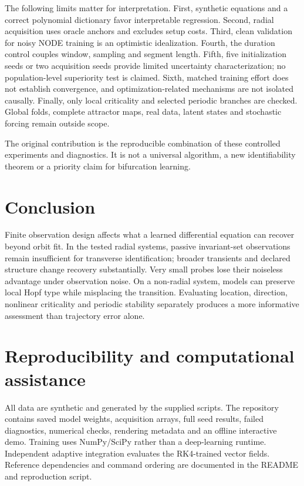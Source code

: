 \documentclass[11pt,a4paper]{article}
\begin{document}
The following limits matter for interpretation. First, synthetic equations and a correct polynomial dictionary favor interpretable regression. Second, radial acquisition uses oracle anchors and excludes setup costs. Third, clean validation for noisy NODE training is an optimistic idealization. Fourth, the duration control couples window, sampling and segment length. Fifth, five initialization seeds or two acquisition seeds provide limited uncertainty characterization; no population-level superiority test is claimed. Sixth, matched training effort does not establish convergence, and optimization-related mechanisms are not isolated causally. Finally, only local criticality and selected periodic branches are checked. Global folds, complete attractor maps, real data, latent states and stochastic forcing remain outside scope.

The original contribution is the reproducible combination of these controlled experiments and diagnostics. It is not a universal algorithm, a new identifiability theorem or a priority claim for bifurcation learning.

\section{Conclusion}
Finite observation design affects what a learned differential equation can recover beyond orbit fit. In the tested radial systems, passive invariant-set observations remain insufficient for transverse identification; broader transients and declared structure change recovery substantially. Very small probes lose their noiseless advantage under observation noise. On a non-radial system, models can preserve local Hopf type while misplacing the transition. Evaluating location, direction, nonlinear criticality and periodic stability separately produces a more informative assessment than trajectory error alone.

\section*{Reproducibility and computational assistance}
All data are synthetic and generated by the supplied scripts. The repository contains saved model weights, acquisition arrays, full seed results, failed diagnostics, numerical checks, rendering metadata and an offline interactive demo. Training uses NumPy/SciPy rather than a deep-learning runtime. Independent adaptive integration evaluates the RK4-trained vector fields. Reference dependencies and command ordering are documented in the README and reproduction script.
\end{document}
